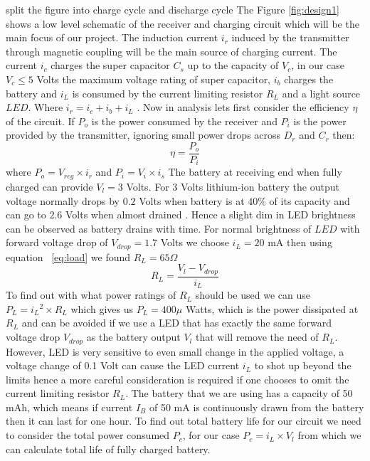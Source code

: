  split the figure into charge cycle and discharge cycle
The Figure \ref{fig:design1}
shows a low level schematic of the receiver and charging circuit which will be the main focus of our project. The induction current $i_r$ induced by the transmitter through magnetic coupling will be the main source of charging current. The current $i_c$ charges the super capacitor $C_s$ up to the capacity of $V_c$, in our case $V_c \leq 5$ Volts the maximum voltage rating of super capacitor, $i_b$ charges the battery and $i_L$ is consumed by the current limiting resistor $R_L$  and a light source $LED$. Where $i_r = i_c + i_b +i_L$ . Now in analysis lets first consider the efficiency ${\eta}$ of the circuit.
If $P_{o}$ is the power consumed by the receiver and $P_{i}$ is the power provided by the transmitter, ignoring small power drops across $D_r$ and $C_r$  then:
\begin{equation}\label{eq:effb}
 {\eta} = \frac{P_o}{P_i}
\end{equation}
where $P_o = V_{reg} \times i_r $ and $P_i = V_i \times i_s $
The battery at receiving end when fully charged can provide $V_l = 3 $ Volts.
For 3 Volts lithium-ion battery the output voltage normally drops by $0.2 $ Volts when battery is at $40 \%$ of its capacity and can go to $2.6 $ Volts when almost drained \cite{IAmp}. Hence a slight dim in LED brightness can be observed as battery drains with time.
For normal brightness of $LED$ with forward voltage drop of $V_{drop} = 1.7 $ Volts we choose $i_L = 20 $ mA then using equation ~\ref{eq:load} we found $R_L = 65 \Omega $
\begin{equation}\label{eq:load}
 R_L = \frac{V_l - V_{drop}}{i_L}
\end{equation}
To find out with what power ratings of $R_L$ should be used we can use $P_L = {i_L}^2 \times R_L $ which gives us $P_L = 400 \mu$ Watts, which is the power dissipated at $R_L$ and can be avoided if we use a LED that has exactly the same forward voltage drop $V_{drop}$ as the battery output $V_l$ that will remove the need of $R_L$. However, LED is very sensitive to even small change in the applied voltage, a voltage change of 0.1 Volt can cause the LED current $i_L$ to shot up beyond the limits hence a more careful consideration is required if one chooses to omit the current limiting resistor $R_L$.
The battery that we are using has a capacity of 50 mAh, which means if current $I_B$ of 50 mA  is continuously drawn from the battery then it can last for one hour. To find out total battery life for our circuit we need to consider the total power consumed $P_c$, for our case $P_c = i_L \times V_l $ from which we can calculate total life of fully charged battery.

